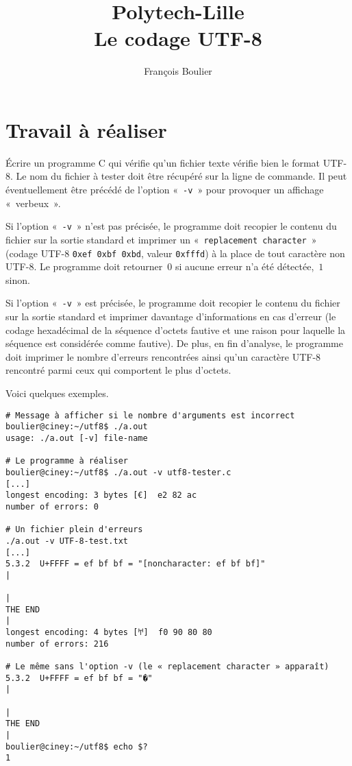 \documentclass[12pt]{article}
\title{Polytech-Lille \\ Le codage UTF-8}
\author{François Boulier}
\newcounter{points_counter}
\newcounter{section_points_counter}
\begin{document}
\maketitle

\section{Travail à réaliser}

Écrire un programme C qui vérifie qu'un fichier texte vérifie
bien le format UTF-8. Le nom du fichier à tester doit être récupéré
sur la ligne de commande. Il peut éventuellement être précédé de
l'option «~{\tt -v}~» pour provoquer un affichage «~verbeux~».

Si l'option «~{\tt -v}~» n'est pas précisée, le programme doit
recopier le contenu du fichier sur la sortie standard et imprimer
un «~{\tt replacement character}~» (codage UTF-8 {\tt 0xef 0xbf 0xbd},
valeur {\tt 0xfffd}) à la place de tout caractère non UTF-8.
Le programme doit retourner~$0$ si aucune erreur n'a été détectée,~$1$
sinon.

Si l'option «~{\tt -v}~» est précisée, le programme doit
recopier le contenu du fichier sur la sortie standard et imprimer
davantage d'informations en cas d'erreur (le codage hexadécimal
de la séquence d'octets fautive et une raison pour laquelle
la séquence est considérée comme fautive). De plus, en fin d'analyse,
le programme doit imprimer le nombre d'erreurs rencontrées ainsi
qu'un caractère UTF-8 rencontré parmi ceux qui comportent le
plus d'octets.

Voici quelques exemples.
\begin{verbatim}
# Message à afficher si le nombre d'arguments est incorrect
boulier@ciney:~/utf8$ ./a.out 
usage: ./a.out [-v] file-name

# Le programme à réaliser
boulier@ciney:~/utf8$ ./a.out -v utf8-tester.c 
[...]
longest encoding: 3 bytes [€]  e2 82 ac
number of errors: 0

# Un fichier plein d'erreurs
./a.out -v UTF-8-test.txt 
[...]
5.3.2  U+FFFF = ef bf bf = "[noncharacter: ef bf bf]"                                                |
                                                                              |
THE END                                                                       |
longest encoding: 4 bytes [𐀀]  f0 90 80 80
number of errors: 216

# Le même sans l'option -v (le « replacement character » apparaît)
5.3.2  U+FFFF = ef bf bf = "�"                                                |
                                                                              |
THE END                                                                       |
boulier@ciney:~/utf8$ echo $?
1
\end{verbatim}
\end{document}
